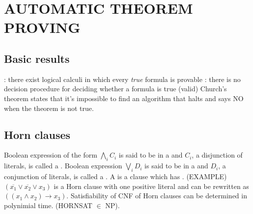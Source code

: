 \section{AUTOMATIC THEOREM PROVING}
\subsection{Basic results}
\bit
\w{}: there exist logical calculi
in which every {\em true\/} formula is provable
\w {}:
there is no decision procedure for deciding whether a formula is true (valid)
\w Church's theorem states that it's impossible to find an algorithm
that halts and says NO when the theorem is not true.
\eit


\subsection{Horn clauses}
\bit
\w Boolean expression of the form $\bigwedge_i C_i$ is said to be in a
 and $C_i$, a disjunction of literals, is called a
. 
\w Boolean expression $\bigvee_i D_i$ is said to be in a
 and $D_i$, a conjunction of literals, is called a
. 
\w A  is a clause which has .
\w (EXAMPLE) $(\overline{x_1} \vee \overline{x_2} \vee x_3)$ is a Horn clause
   with one positive literal 
   and can be rewritten as $((x_1 \wedge x_2) \rightarrow x_3)$.
\w Satisfiability of CNF of Horn clauses can be determined in polynimial time.
   (HORNSAT $\in$ NP).
\eit
